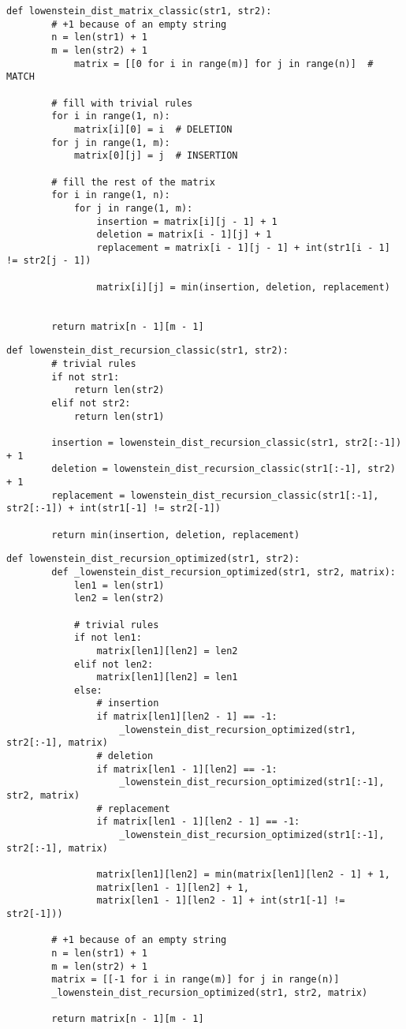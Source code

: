\begin{lstlisting}[caption=Функция поиска расстояния Левенштейна с заполнением матрицы расстояний,
	label={lev_matrix}]
	def lowenstein_dist_matrix_classic(str1, str2):
		# +1 because of an empty string
		n = len(str1) + 1
		m = len(str2) + 1
			matrix = [[0 for i in range(m)] for j in range(n)]  # MATCH
		
		# fill with trivial rules
		for i in range(1, n):
			matrix[i][0] = i  # DELETION
		for j in range(1, m):
			matrix[0][j] = j  # INSERTION
		
		# fill the rest of the matrix
		for i in range(1, n):
			for j in range(1, m):
				insertion = matrix[i][j - 1] + 1
				deletion = matrix[i - 1][j] + 1
				replacement = matrix[i - 1][j - 1] + int(str1[i - 1] != str2[j - 1])
				
				matrix[i][j] = min(insertion, deletion, replacement)
		
		
		return matrix[n - 1][m - 1]
\end{lstlisting}


\begin{lstlisting}[caption=Функция рекурсивного алгоритма поиска расстояния Левенштейна без кеширования,
	label={lev_recursion_classic}]
	def lowenstein_dist_recursion_classic(str1, str2):
		# trivial rules
		if not str1:
			return len(str2)
		elif not str2:
			return len(str1)
		
		insertion = lowenstein_dist_recursion_classic(str1, str2[:-1]) + 1
		deletion = lowenstein_dist_recursion_classic(str1[:-1], str2) + 1
		replacement = lowenstein_dist_recursion_classic(str1[:-1], str2[:-1]) + int(str1[-1] != str2[-1])
		
		return min(insertion, deletion, replacement)
\end{lstlisting}

\begin{lstlisting}[caption=Функция рекурсивного алгоритма поиска расстояния Левенштейна c кешированием,
	label={lev_recursion_optimized}]
	def lowenstein_dist_recursion_optimized(str1, str2):
		def _lowenstein_dist_recursion_optimized(str1, str2, matrix):
			len1 = len(str1)
			len2 = len(str2)
			
			# trivial rules
			if not len1:
				matrix[len1][len2] = len2
			elif not len2:
				matrix[len1][len2] = len1
			else:
				# insertion
				if matrix[len1][len2 - 1] == -1:
					_lowenstein_dist_recursion_optimized(str1, str2[:-1], matrix)
				# deletion
				if matrix[len1 - 1][len2] == -1:
					_lowenstein_dist_recursion_optimized(str1[:-1], str2, matrix)
				# replacement
				if matrix[len1 - 1][len2 - 1] == -1:
					_lowenstein_dist_recursion_optimized(str1[:-1], str2[:-1], matrix)
				
				matrix[len1][len2] = min(matrix[len1][len2 - 1] + 1,
				matrix[len1 - 1][len2] + 1,
				matrix[len1 - 1][len2 - 1] + int(str1[-1] != str2[-1]))
		
		# +1 because of an empty string
		n = len(str1) + 1
		m = len(str2) + 1
		matrix = [[-1 for i in range(m)] for j in range(n)]
		_lowenstein_dist_recursion_optimized(str1, str2, matrix)
		
		return matrix[n - 1][m - 1]
\end{lstlisting}

